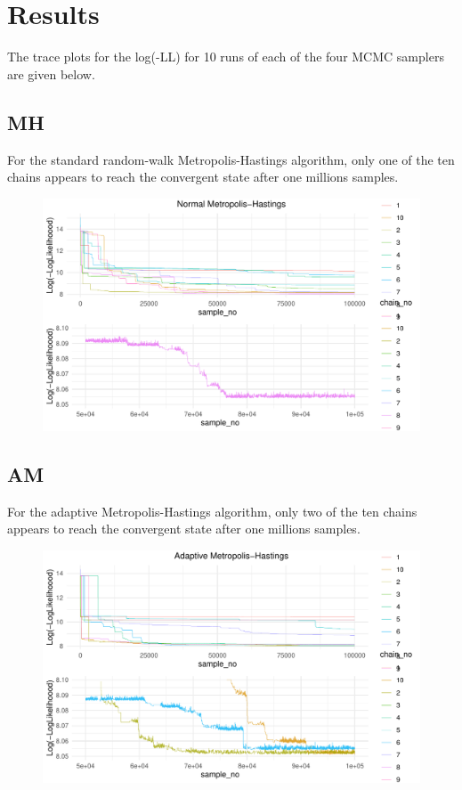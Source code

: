 \documentclass[10pt,twoside]{report} %
\begin{document}
\newpage
\section{Results}
The trace plots for the log(-LL) for 10 runs of each of the four MCMC samplers are given below. 

\subsection{MH}

For the standard random-walk Metropolis-Hastings algorithm, only one of the ten chains appears to reach the convergent state after one millions samples. 

\begin{figure}[H] %
\centering
    \includegraphics[width=1.0\textwidth]{../figs/llogMH.pdf}
  \caption{\label{fig:1}}  
\end{figure}

\subsection{AM}

For the adaptive Metropolis-Hastings algorithm, only two of the ten chains appears to reach the convergent state after one millions samples. 

\begin{figure}[H] %
\centering
    \includegraphics[width=1.0\textwidth]{../figs/llogAM.pdf}
  \caption{\label{fig:2}}  
\end{figure}
\end{document}
